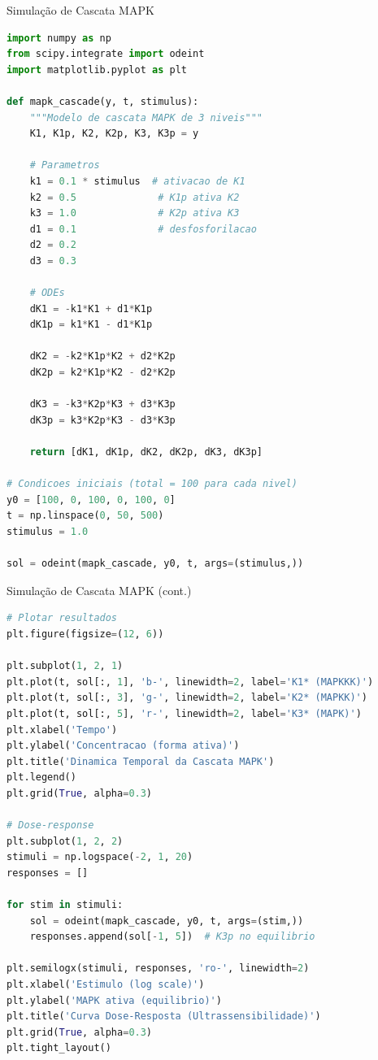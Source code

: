 \begin{frame}[fragile]{Simulação de Cascata MAPK}
\begin{lstlisting}[language=Python, caption=Modelo simplificado de cascata MAPK, basicstyle=\ttfamily\scriptsize]
import numpy as np
from scipy.integrate import odeint
import matplotlib.pyplot as plt

def mapk_cascade(y, t, stimulus):
    """Modelo de cascata MAPK de 3 niveis"""
    K1, K1p, K2, K2p, K3, K3p = y

    # Parametros
    k1 = 0.1 * stimulus  # ativacao de K1
    k2 = 0.5              # K1p ativa K2
    k3 = 1.0              # K2p ativa K3
    d1 = 0.1              # desfosforilacao
    d2 = 0.2
    d3 = 0.3

    # ODEs
    dK1 = -k1*K1 + d1*K1p
    dK1p = k1*K1 - d1*K1p

    dK2 = -k2*K1p*K2 + d2*K2p
    dK2p = k2*K1p*K2 - d2*K2p

    dK3 = -k3*K2p*K3 + d3*K3p
    dK3p = k3*K2p*K3 - d3*K3p

    return [dK1, dK1p, dK2, dK2p, dK3, dK3p]

# Condicoes iniciais (total = 100 para cada nivel)
y0 = [100, 0, 100, 0, 100, 0]
t = np.linspace(0, 50, 500)
stimulus = 1.0

sol = odeint(mapk_cascade, y0, t, args=(stimulus,))
\end{lstlisting}
\end{frame}

\begin{frame}[fragile]{Simulação de Cascata MAPK (cont.)}
\begin{lstlisting}[language=Python, caption=Visualização da cascata, basicstyle=\ttfamily\scriptsize]
# Plotar resultados
plt.figure(figsize=(12, 6))

plt.subplot(1, 2, 1)
plt.plot(t, sol[:, 1], 'b-', linewidth=2, label='K1* (MAPKKK)')
plt.plot(t, sol[:, 3], 'g-', linewidth=2, label='K2* (MAPKK)')
plt.plot(t, sol[:, 5], 'r-', linewidth=2, label='K3* (MAPK)')
plt.xlabel('Tempo')
plt.ylabel('Concentracao (forma ativa)')
plt.title('Dinamica Temporal da Cascata MAPK')
plt.legend()
plt.grid(True, alpha=0.3)

# Dose-response
plt.subplot(1, 2, 2)
stimuli = np.logspace(-2, 1, 20)
responses = []

for stim in stimuli:
    sol = odeint(mapk_cascade, y0, t, args=(stim,))
    responses.append(sol[-1, 5])  # K3p no equilibrio

plt.semilogx(stimuli, responses, 'ro-', linewidth=2)
plt.xlabel('Estimulo (log scale)')
plt.ylabel('MAPK ativa (equilibrio)')
plt.title('Curva Dose-Resposta (Ultrassensibilidade)')
plt.grid(True, alpha=0.3)
plt.tight_layout()
\end{lstlisting}
\end{frame}

